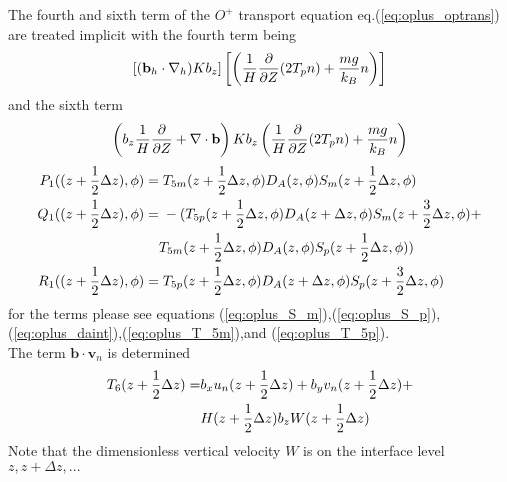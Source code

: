 %
The fourth and sixth term of the $O^+$ transport equation
eq.(\ref{eq:oplus_optrans}) are treated implicit with the fourth
term being
%
\begin{align}
\left[ (\mathbf{b}_h \cdot \nabla_h)
  K b_z\right] \left[ \left( \frac{1}{H}\frac{\partial}{\partial Z} (2 T_p n) + \frac{m g}{k_B}n\right)
  \right] \notag
\end{align}
%
and the sixth term
%
\begin{align}
  \left( b_z \frac{1}{H} \frac{\partial}{\partial Z} + \nabla \cdot
  \mathbf{b} \right) K b_z \left( \frac{1}{H} \frac{\partial}{\partial Z} (2 T_p n) + \frac{m g}{k_B} n\right)
 \notag
\end{align}
%
\begin{align}
  P_1((z+\frac{1}{2}\Delta z),\phi) = & \;  T_{5m}(z+\frac{1}{2}\Delta z,\phi)D_A (z,\phi) S_m(z+\frac{1}{2}\Delta z,\phi)\\
  Q_1((z+\frac{1}{2}\Delta z),\phi) = & \; -( T_{5p}(z+\frac{1}{2}\Delta z,\phi)D_A
          (z+\Delta z,\phi) S_m(z+\frac{3}{2}\Delta z,\phi)
   + \notag \\
   {} & T_{5m}(z+\frac{1}{2}\Delta z,\phi)D_A (z,\phi) S_p(z+\frac{1}{2}\Delta z,\phi)) \\
  R_1((z+\frac{1}{2}\Delta z),\phi) = & \; T_{5p}(z+\frac{1}{2}\Delta z,\phi)D_A (z+\Delta z,\phi) S_p(z+\frac{3}{2}\Delta z,\phi)
\end{align}
%
for the terms please see equations
(\ref{eq:oplus_S_m}),(\ref{eq:oplus_S_p}),
(\ref{eq:oplus_daint}),(\ref{eq:oplus_T_5m}),and
(\ref{eq:oplus_T_5p}). \\
%
The term $\mathbf{b} \cdot \mathbf{v}_n$ is determined
%
\begin{align}
  T_6(z+\frac{1}{2}\Delta z) = &b_x u_n(z+\frac{1}{2}\Delta z) + b_y v_n(z+\frac{1}{2}\Delta z) + \notag \\
    {} & H(z+\frac{1}{2}\Delta z) b_z W(z+\frac{1}{2}\Delta z)
\end{align}
%
Note that the dimensionless vertical velocity $W$ is on the
interface level $z, z+\Delta z, ...$ \\

